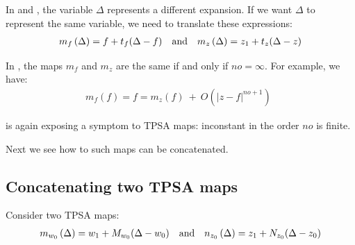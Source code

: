 \documentclass{hitec}     %
\begin{document}
{In  and , the variable $\Delta $ represents a different expansion. If we want $\Delta $ to represent  the same variable, we need to translate these expressions:
%
\begin{align} {m}_{f}\left({\Delta }\right)=f+{t}_{f}(\Delta -f)~~~{\rm a}{\rm n}{\rm d} ~~~{m}_{z}\left({\Delta }\right)={z}_{1}+{t}_{z}(\Delta -z) \label{eq:fixtmapf} \end{align}


In , the maps $m_f$ and $m_z$ are the same if and only if $no=\infty$.  For example, we have:
%
\begin{align} {m}_{f}\left({f}\right)=f=
{m}_{z}\left({f}\right)\ +\ O({\left|{z-f}\right|}^{no+1})~\ \label{eq:fixtmapfe} \end{align}

 is again exposing a symptom to TPSA maps: inconstant in the order ${no}$ is finite.

Next we see how to such maps can be concatenated.

\subsection{Concatenating two TPSA maps}\label{s:concattpsa}
 
 Consider two TPSA maps:
%
\begin{align} {m}_{{w}_{0}}\left({\Delta }\right)={w}_{1}+{M}_{{w}_{0}}(\Delta -{w}_{0})~~~{\rm a}{\rm n}{\rm d} ~~~{n}_{{z}_{0}}\left({\Delta }\right)={z}_{1}+{N}_{{z}_{0}}(\Delta -{z}_{0}) \label{eq:concatt} \end{align}


}
\end{document}
